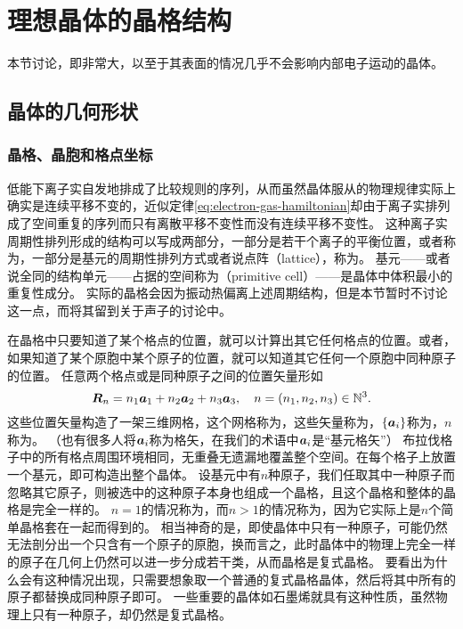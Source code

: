 \chapter{理想晶体的晶格结构}\label{chap:lattice-structure}

本节讨论，即非常大，以至于其表面的情况几乎不会影响内部电子运动的晶体。

\section{晶体的几何形状}

\subsection{晶格、晶胞和格点坐标}

低能下离子实自发地排成了比较规则的序列，从而虽然晶体服从的物理规律实际上确实是连续平移不变的，近似定律\eqref{eq:electron-gas-hamiltonian}却由于离子实排列成了空间重复的序列而只有离散平移不变性而没有连续平移不变性。
这种离子实周期性排列形成的结构可以写成两部分，一部分是若干个离子的平衡位置，或者称为，一部分是基元的周期性排列方式或者说点阵（lattice），称为。
基元——或者说全同的结构单元——占据的空间称为（primitive cell）——是晶体中体积最小的重复性成分。
实际的晶格会因为振动热偏离上述周期结构，但是本节暂时不讨论这一点，而将其留到关于声子的讨论中。

在晶格中只要知道了某个格点的位置，就可以计算出其它任何格点的位置。或者，如果知道了某个原胞中某个原子的位置，就可以知道其它任何一个原胞中同种原子的位置。
任意两个格点或是同种原子之间的位置矢量形如
\begin{equation}
    \vb*{R}_n = n_1 \vb*{a}_1 + n_2 \vb*{a}_2 + n_3 \vb*{a}_3, \quad n = (n_1, n_2, n_3) \in \mathbb{N}^3.
\end{equation}
这些位置矢量构造了一架三维网格，这个网格称为，这些矢量称为，$\{\vb*{a}_i\}$称为，$n$称为。
（也有很多人将$\vb*{a}_i$称为格矢，在我们的术语中$\vb*{a}_i$是“基元格矢”）
布拉伐格子中的所有格点周围环境相同，无重叠无遗漏地覆盖整个空间。在每个格子上放置一个基元，即可构造出整个晶体。
设基元中有$n$种原子，我们任取其中一种原子而忽略其它原子，则被选中的这种原子本身也组成一个晶格，且这个晶格和整体的晶格是完全一样的。
$n=1$的情况称为，而$n>1$的情况称为，因为它实际上是$n$个简单晶格套在一起而得到的。
相当神奇的是，即使晶体中只有一种原子，可能仍然无法剖分出一个只含有一个原子的原胞，换而言之，此时晶体中的物理上完全一样的原子在几何上仍然可以进一步分成若干类，从而晶格是复式晶格。
要看出为什么会有这种情况出现，只需要想象取一个普通的复式晶格晶体，然后将其中所有的原子都替换成同种原子即可。
一些重要的晶体如石墨烯就具有这种性质，虽然物理上只有一种原子，却仍然是复式晶格。

